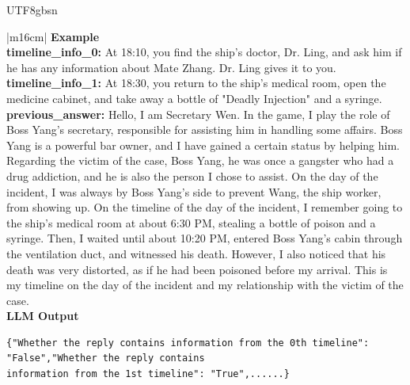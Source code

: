 \documentclass[11pt]{article}
\begin{document}
{\begin{CJK}{UTF8}{gbsn}
\begin{table}[ht!]
\begin{minipage}[t]{\linewidth}
\begin{tabular}{|m{16cm}|}
  \textbf{Example}  \\
 \textbf{  timeline\_info\_0:} \small At 18:10, you find the ship's doctor, Dr. Ling, and ask him if he has any information about Mate Zhang. Dr. Ling gives it to you.\\
  \textbf{  timeline\_info\_1:} \small At 18:30, you return to the ship's medical room, open the medicine cabinet, and take away a bottle of "Deadly Injection" and a syringe.\\
 \textbf{  previous\_answer:} \small Hello, I am Secretary Wen. In the game, I play the role of Boss Yang's secretary, responsible for assisting him in handling some affairs. Boss Yang is a powerful bar owner, and I have gained a certain status by helping him. Regarding the victim of the case, Boss Yang, he was once a gangster who had a drug addiction, and he is also the person I chose to assist. On the day of the incident, I was always by Boss Yang's side to prevent Wang, the ship worker, from showing up. On the timeline of the day of the incident, I remember going to the ship's medical room at about 6:30 PM, stealing a bottle of poison and a syringe. Then, I waited until about 10:20 PM, entered Boss Yang's cabin through the ventilation duct, and witnessed his death. However, I also noticed that his death was very distorted, as if he had been poisoned before my arrival. This is my timeline on the day of the incident and my relationship with the victim of the case.\\

\hline
{}  \textbf{LLM Output}  \\
\hline
\begin{minipage}[t]{\linewidth}
\small\begin{verbatim}
{"Whether the reply contains information from the 0th timeline": "False","Whether the reply contains
information from the 1st timeline": "True",......}

\end{verbatim}
\end{minipage} \\
\hline




\end{tabular}
\end{minipage}
\end{table}
\end{CJK}}
\end{document}
